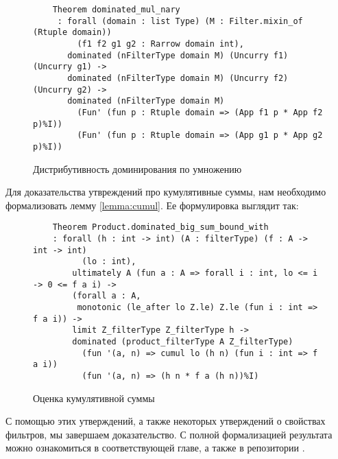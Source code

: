 \begin{figure}[H]
  \caption{Дистрибутивность доминирования по умножению}
  \label{code:dominated_mul_nary}
  \begin{verbatim}
    Theorem dominated_mul_nary
	 : forall (domain : list Type) (M : Filter.mixin_of (Rtuple domain))
         (f1 f2 g1 g2 : Rarrow domain int),
       dominated (nFilterType domain M) (Uncurry f1) (Uncurry g1) ->
       dominated (nFilterType domain M) (Uncurry f2) (Uncurry g2) ->
       dominated (nFilterType domain M)
         (Fun' (fun p : Rtuple domain => (App f1 p * App f2 p)%I))
         (Fun' (fun p : Rtuple domain => (App g1 p * App g2 p)%I))
  \end{verbatim}
\end{figure}
Для доказательства утвреждений про кумулятивные суммы, нам необходимо формализовать лемму \ref{lemma:cumul}. Ее формулировка выглядит так:
\begin{figure}[H]
  \caption{Оценка кумулятивной суммы}
  \label{code:sub_bound}
  \begin{verbatim}
    Theorem Product.dominated_big_sum_bound_with
    : forall (h : int -> int) (A : filterType) (f : A -> int -> int)
          (lo : int),
        ultimately A (fun a : A => forall i : int, lo <= i -> 0 <= f a i) ->
        (forall a : A,
         monotonic (le_after lo Z.le) Z.le (fun i : int => f a i)) ->
        limit Z_filterType Z_filterType h ->
        dominated (product_filterType A Z_filterType)
          (fun '(a, n) => cumul lo (h n) (fun i : int => f a i))
          (fun '(a, n) => (h n * f a (h n))%I)
  \end{verbatim}
\end{figure}

С помощью этих утверждений, а также некоторых утверждений о свойствах фильтров, мы завершаем доказательство.
С полной формализацией результата можно ознакомиться в соответствующей главе, а также в репозитории \cite{Grigoryants2021}.